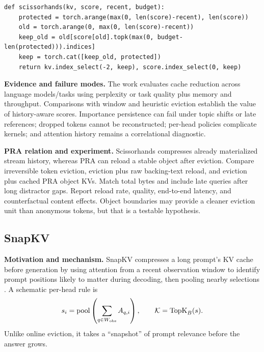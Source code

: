 \begin{lstlisting}[caption={Periodic history-score pruning}]
def scissorhands(kv, score, recent, budget):
    protected = torch.arange(max(0, len(score)-recent), len(score))
    old = torch.arange(0, max(0, len(score)-recent))
    keep_old = old[score[old].topk(max(0, budget-len(protected))).indices]
    keep = torch.cat([keep_old, protected])
    return kv.index_select(-2, keep), score.index_select(0, keep)
\end{lstlisting}

\textbf{Evidence and failure modes.} The work evaluates cache reduction across language
models/tasks using perplexity or task quality plus memory and throughput.  Comparisons with
window and heuristic eviction establish the value of history-aware scores.  Importance
persistence can fail under topic shifts or late references; dropped tokens cannot be
reconstructed; per-head policies complicate kernels; and attention history remains a
correlational diagnostic.

\textbf{PRA relation and experiment.} Scissorhands compresses already materialized stream
history, whereas PRA can reload a stable object after eviction.  Compare irreversible token
eviction, eviction plus raw backing-text reload, and eviction plus cached PRA object KVs.
Match total bytes and include late queries after long distractor gaps.  Report reload rate,
quality, end-to-end latency, and counterfactual content effects.  Object boundaries may
provide a cleaner eviction unit than anonymous tokens, but that is a testable hypothesis.

\subsection{SnapKV}

\textbf{Motivation and mechanism.} SnapKV compresses a long prompt's KV cache before
generation by using attention from a recent observation window to identify prompt positions
likely to matter during decoding, then pooling nearby selections \citep{li2024snapkv}.  A
schematic per-head rule is
\begin{equation}
s_i=\operatorname{pool}\left(\sum_{q\in W_{\rm obs}}A_{q,i}\right),\qquad
\mathcal K=\operatorname{TopK}_B(s).
\end{equation}
Unlike online eviction, it takes a ``snapshot'' of prompt relevance before the answer grows.

